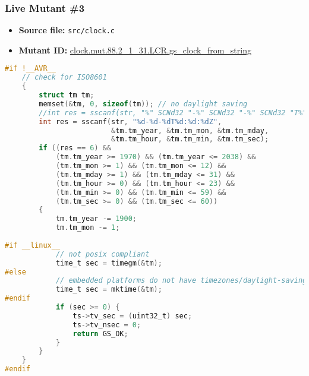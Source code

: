 
\subsubsection{Live Mutant \#3}

\begin{itemize}
\item \textbf{Source file:} \texttt{src/clock.c}
\item \textbf{Mutant ID:} \url{clock.mut.88.2_1_31.LCR.gs_clock_from_string}
\end{itemize}

\begin{lstlisting}[language=C, label=live_3, caption=Original source code.]
#if !__AVR__
    // check for ISO8601
    {
        struct tm tm;
        memset(&tm, 0, sizeof(tm)); // no daylight saving
        //int res = sscanf(str, "%" SCNd32 "-%" SCNd32 "-%" SCNd32 "T%" SCNd32 ":%" SCNd32 ":%" SCNd32 "Z",
        int res = sscanf(str, "%d-%d-%dT%d:%d:%dZ",
                         &tm.tm_year, &tm.tm_mon, &tm.tm_mday,
                         &tm.tm_hour, &tm.tm_min, &tm.tm_sec);
        if ((res == 6) &&
            (tm.tm_year >= 1970) && (tm.tm_year <= 2038) &&
            (tm.tm_mon >= 1) && (tm.tm_mon <= 12) &&
            (tm.tm_mday >= 1) && (tm.tm_mday <= 31) &&
            (tm.tm_hour >= 0) && (tm.tm_hour <= 23) &&
            (tm.tm_min >= 0) && (tm.tm_min <= 59) &&
            (tm.tm_sec >= 0) && (tm.tm_sec <= 60))
        {
            tm.tm_year -= 1900;
            tm.tm_mon -= 1;
 
#if __linux__
            // not posix compliant
            time_t sec = timegm(&tm);
#else
            // embedded platforms do not have timezones/daylight-saving - so standard mktime works
            time_t sec = mktime(&tm);
#endif
            if (sec >= 0) {
                ts->tv_sec = (uint32_t) sec;
                ts->tv_nsec = 0;
                return GS_OK;
            }
        }
    }
#endif

\end{lstlisting}


